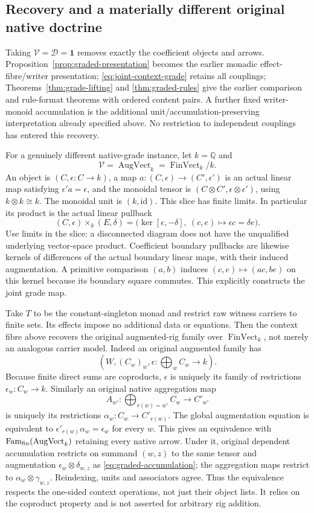 \documentclass[11pt]{article}
\newcommand{\id}{\mathrm{id}}
\begin{document}
\subsection{Recovery and a materially different original native doctrine}

Taking $\mathcal V=\mathcal D=\mathbf 1$ removes exactly the coefficient objects and arrows. Proposition~\ref{prop:graded-presentation} becomes the earlier monadic effect-fibre/writer presentation; \eqref{eq:joint-context-grade} retains all couplings; Theorems~\ref{thm:grade-lifting} and \ref{thm:graded-rules} give the earlier comparison and rule-format theorems with ordered content pairs. A further fixed writer-monoid accumulation is the additional unit/accumulation-preserving interpretation already specified above. No restriction to independent couplings has entered this recovery.

For a genuinely different native-grade instance, let $k=\mathbb Q$ and
\[
 \mathcal V=\operatorname{AugVect}_k=\operatorname{FinVect}_k/k.
\]
An object is $(C,\epsilon:C\to k)$, a map $a:(C,\epsilon)\to(C',\epsilon')$ is an actual linear map satisfying $\epsilon'a=\epsilon$, and the monoidal tensor is $(C\otimes C',\epsilon\otimes\epsilon')$, using $k\otimes k\cong k$. The monoidal unit is $(k,\id)$. This slice has finite limits. In particular its product is the actual linear pullback
\[
 (C,\epsilon)\times_k(E,\delta)
 =\bigl(\ker[\epsilon,-\delta],\ (c,e)\mapsto\epsilon c=\delta e\bigr). \tag{AV}\label{eq:augmented-pullback}
\]
Use limits in the slice: a disconnected diagram does not have the unqualified underlying vector-space product. Coefficient boundary pullbacks are likewise kernels of differences of the actual boundary linear maps, with their induced augmentation. A primitive comparison $(a,b)$ induces $(c,e)\mapsto(ac,be)$ on this kernel because its boundary square commutes. This explicitly constructs the joint grade map.

Take $T$ to be the constant-singleton monad and restrict raw witness carriers to finite sets. Its effects impose no additional data or equations. Then the context fibre above recovers the original augmented-rig family over $\operatorname{FinVect}_k$, not merely an analogous carrier model. Indeed an original augmented family has
\[
 (W,(C_w)_w,\epsilon:\textstyle\bigoplus_w C_w\to k).
\]
Because finite direct sums are coproducts, $\epsilon$ is uniquely its family of restrictions $\epsilon_w:C_w\to k$. Similarly an original native aggregation map
\[
 A_{w'}:\bigoplus_{r(w)=w'}C_w\longrightarrow C'_{w'}
\]
is uniquely its restrictions $\alpha_w:C_w\to C'_{r(w)}$. The global augmentation equation is equivalent to $\epsilon'_{r(w)}\alpha_w=\epsilon_w$ for every $w$. This gives an equivalence with $\operatorname{Fam}_{\rm fin}(\operatorname{AugVect}_k)$ retaining every native arrow. Under it, original dependent accumulation restricts on summand $(w,z)$ to the same tensor and augmentation $\epsilon_w\otimes\delta_{w,z}$ as \eqref{eq:graded-accumulation}; the aggregation maps restrict to $\alpha_w\otimes\gamma_{w,z}$. Reindexing, units and associators agree. Thus the equivalence respects the one-sided context operations, not just their object lists. It relies on the coproduct property and is not asserted for arbitrary rig addition.
\end{document}
